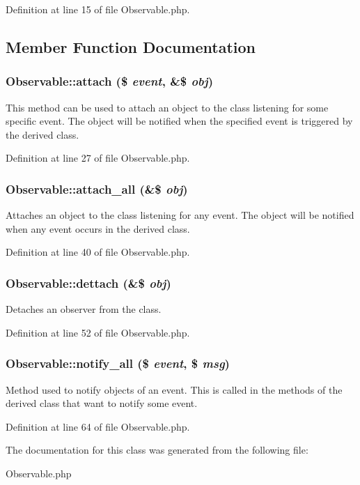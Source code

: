 Definition at line 15 of file Observable.php.

\subsection{Member Function Documentation}
\subsubsection{\setlength{\rightskip}{0pt plus 5cm}Observable::attach (\$ {\em event}, \&\$ {\em obj})}\label{classObservable_a1}


This method can be used to attach an object to the class listening for some specific event. The object will be notified when the specified event is triggered by the derived class. 

Definition at line 27 of file Observable.php.
\subsubsection{\setlength{\rightskip}{0pt plus 5cm}Observable::attach\_\-all (\&\$ {\em obj})}\label{classObservable_a2}


Attaches an object to the class listening for any event. The object will be notified when any event occurs in the derived class. 

Definition at line 40 of file Observable.php.
\subsubsection{\setlength{\rightskip}{0pt plus 5cm}Observable::dettach (\&\$ {\em obj})}\label{classObservable_a3}


Detaches an observer from the class. 

Definition at line 52 of file Observable.php.
\subsubsection{\setlength{\rightskip}{0pt plus 5cm}Observable::notify\_\-all (\$ {\em event}, \$ {\em msg})\hspace{0.3cm}{\tt  [protected]}}\label{classObservable_b0}


Method used to notify objects of an event. This is called in the methods of the derived class that want to notify some event. 

Definition at line 64 of file Observable.php.

The documentation for this class was generated from the following file:\begin{CompactItemize}
\item 
Observable.php\end{CompactItemize}
